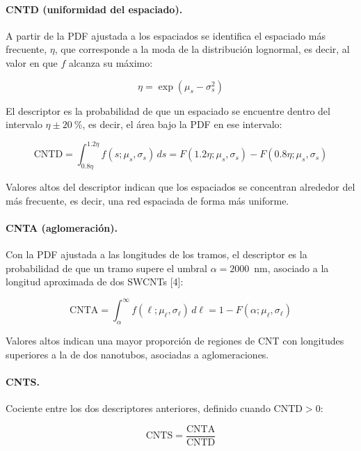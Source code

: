 \paragraph{CNTD (uniformidad del espaciado).}
A partir de la PDF ajustada a los espaciados se identifica el espaciado más frecuente, $\eta$, que corresponde a la moda de la distribución lognormal, es decir, al valor en que $f$ alcanza su máximo:

\begin{equation}
\eta = \exp\left(\mu_s - \sigma_s^2\right)
\label{eq:moda}
\end{equation}

El descriptor es la probabilidad de que un espaciado se encuentre dentro del intervalo $\eta \pm 20~\%$, es decir, el área bajo la PDF en ese intervalo:

\begin{equation}
\mathrm{CNTD} = \int_{0.8\eta}^{1.2\eta} f(s;\mu_s,\sigma_s)\, ds = F(1.2\eta;\mu_s,\sigma_s) - F(0.8\eta;\mu_s,\sigma_s)
\label{eq:cntd}
\end{equation}

Valores altos del descriptor indican que los espaciados se concentran alrededor del más frecuente, es decir, una red espaciada de forma más uniforme.

\paragraph{CNTA (aglomeración).}
Con la PDF ajustada a las longitudes de los tramos, el descriptor es la probabilidad de que un tramo supere el umbral $\alpha = 2000$~nm, asociado a la longitud aproximada de dos SWCNTs [4]:

\begin{equation}
\mathrm{CNTA} = \int_{\alpha}^{\infty} f(\ell;\mu_\ell,\sigma_\ell)\, d\ell = 1 - F(\alpha;\mu_\ell,\sigma_\ell)
\label{eq:cnta}
\end{equation}

Valores altos indican una mayor proporción de regiones de CNT con longitudes superiores a la de dos nanotubos, asociadas a aglomeraciones.

\paragraph{CNTS.}
Cociente entre los dos descriptores anteriores, definido cuando $\mathrm{CNTD} > 0$:

\begin{equation}
\mathrm{CNTS} = \frac{\mathrm{CNTA}}{\mathrm{CNTD}}
\label{eq:cnts}
\end{equation}

